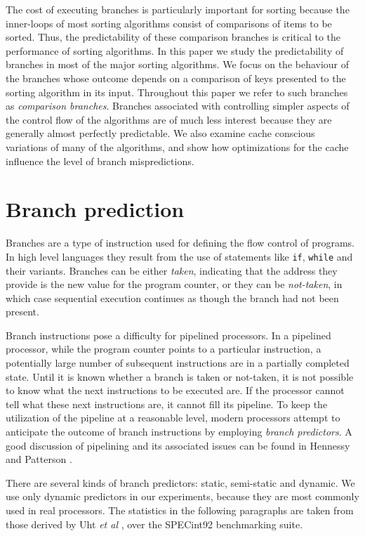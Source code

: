 \documentclass[acmtocl]{acmtrans2m}
\begin{document}
The cost of executing branches is particularly important for sorting
because the inner-loops of most sorting algorithms consist of
comparisons of items to be sorted. Thus, the predictability of
these comparison branches is critical to the performance of
sorting algorithms. In this paper we study the predictability
of branches in most of the major sorting algorithms. 
We focus on the behaviour of the branches whose outcome depends on a
comparison of keys presented to the sorting algorithm in its input. Throughout this paper we refer to
such branches as \textit{comparison branches}. Branches associated with controlling simpler aspects 
of the control flow of the algorithms are of much less interest because they are generally almost perfectly predictable.
We also examine cache conscious variations of many of the algorithms,
and show how optimizations for the cache influence the level of branch
mispredictions.

\section{Branch prediction}
\label{branch_prediction}

Branches are a type of instruction used for defining the flow control of programs. In high level languages they result from 
the use of statements like \texttt{if}, \texttt{while} and their variants. Branches can be either \textit{taken}, indicating that the
address they provide is the new value for the program counter, or they can be \textit{not-taken}, in which case sequential execution continues
as though the branch had not been present.

Branch instructions pose a difficulty for pipelined 
processors. In a pipelined processor, while the program counter points to a particular instruction, a potentially large
number of subsequent instructions are in a partially completed state.
Until it is known whether a branch is taken or not-taken, it is not possible to know what the next instructions to be executed are.
If the processor cannot tell what these next instructions are, it cannot fill its pipeline.
To keep the utilization of the pipeline at a reasonable level, modern processors attempt to anticipate the outcome of 
branch instructions by employing \textit{branch predictors}. A good discussion of pipelining and its associated issues can
be found in Hennessy and Patterson \citeyear{HennessyPatterson90}.
 
There are several kinds of branch predictors: static, semi-static and dynamic. We use only dynamic predictors in our experiments, 
because they are most commonly used in real processors. The statistics in the following paragraphs are taken from those derived
by Uht \textit{et al} \citeyear{Uht+97}, over the SPECint92 benchmarking suite. 
\end{document}
